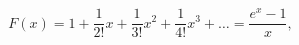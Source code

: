 \begin{equation}
F(x)=1+\frac{1}{2!}x+\frac{1}{3!}x^{2}+\frac{1}{4!}x^{3}+\dots =\frac{e^{x}-1%
}{x},  \label{EFE}
\end{equation}%
